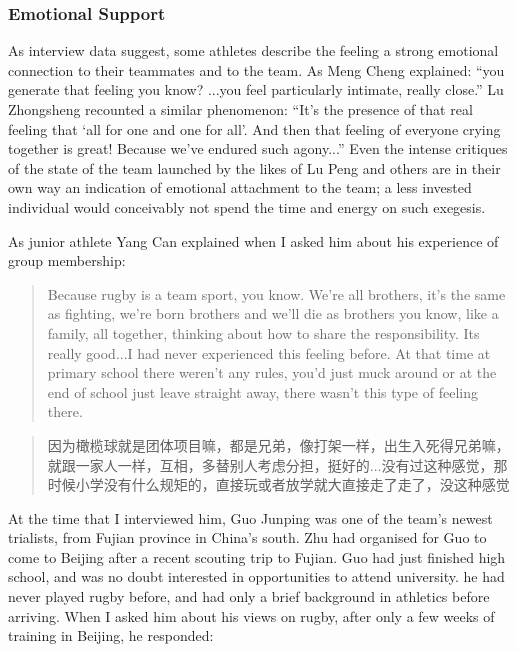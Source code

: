 \begin{CJK}{UTF8}{gbsn}
  \subsubsection{Emotional Support}

As interview data suggest, some athletes describe the feeling a strong emotional connection to their teammates and to the team.  As Meng Cheng explained: ``you generate that feeling you know? ...you feel particularly intimate, really close.'' Lu Zhongsheng recounted a similar phenomenon: ``It's the presence of that real feeling that `all for one and one for all'.  And then that feeling of everyone crying together is great! Because we've endured such agony...''   Even the intense critiques of the state of the team launched by the likes of Lu Peng and others are in their own way an indication of emotional attachment to the team; a less invested individual would conceivably not spend the time and energy on such exegesis.

As junior athlete Yang Can explained when I asked him about his experience of group membership:

    \begin{quotation}
      Because rugby is a team sport, you know. We’re all brothers, it's the same as fighting, we’re born brothers and we’ll die as brothers you know, like a family, all together, thinking about how to share the responsibility. Its really good...I had never experienced this feeling before.  At that time at primary school there weren’t any rules, you’d just muck around or at the end of school just leave straight away, there wasn’t this type of feeling there.
    \end{quotation}

    \begin{quotation}
      因为橄榄球就是团体项目嘛，都是兄弟，像打架一样，出生入死得兄弟嘛，就跟一家人一样，互相，多替别人考虑分担，挺好的...没有过这种感觉，那时候小学没有什么规矩的，直接玩或者放学就大直接走了走了，没这种感觉
    \end{quotation}

At the time that I interviewed him, Guo Junping  was one of the team's newest trialists, from Fujian province in China's south.  Zhu had organised for Guo to come to Beijing after a recent scouting trip to Fujian.  Guo had just finished high school, and was no doubt interested in opportunities to attend university. he had never played rugby before, and had only a brief background in athletics before arriving.  When I asked him about his views on rugby, after only a few weeks of training in Beijing, he responded:


\end{CJK}
